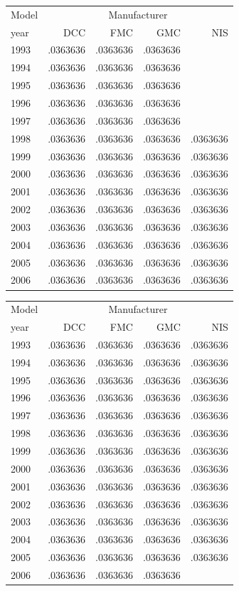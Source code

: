 \begin{tabular}{lrrrr}
\toprule
Model & \multicolumn{4}{c}{Manufacturer} \\
year & DCC & FMC & GMC & NIS \\
\midrule
1993 & .0363636 & .0363636 & .0363636 &  \\
1994 & .0363636 & .0363636 & .0363636 &  \\
1995 & .0363636 & .0363636 & .0363636 &  \\
1996 & .0363636 & .0363636 & .0363636 &  \\
1997 & .0363636 & .0363636 & .0363636 &  \\
1998 & .0363636 & .0363636 & .0363636 & .0363636 \\
1999 & .0363636 & .0363636 & .0363636 & .0363636 \\
2000 & .0363636 & .0363636 & .0363636 & .0363636 \\
2001 & .0363636 & .0363636 & .0363636 & .0363636 \\
2002 & .0363636 & .0363636 & .0363636 & .0363636 \\
2003 & .0363636 & .0363636 & .0363636 & .0363636 \\
2004 & .0363636 & .0363636 & .0363636 & .0363636 \\
2005 & .0363636 & .0363636 & .0363636 & .0363636 \\
2006 & .0363636 & .0363636 & .0363636 & .0363636 \\
\bottomrule
\end{tabular}

\begin{tabular}{lrrrr}
\toprule
Model & \multicolumn{4}{c}{Manufacturer} \\
year & DCC & FMC & GMC & NIS \\
\midrule
1993 & .0363636 & .0363636 & .0363636 & .0363636 \\
1994 & .0363636 & .0363636 & .0363636 & .0363636 \\
1995 & .0363636 & .0363636 & .0363636 & .0363636 \\
1996 & .0363636 & .0363636 & .0363636 & .0363636 \\
1997 & .0363636 & .0363636 & .0363636 & .0363636 \\
1998 & .0363636 & .0363636 & .0363636 & .0363636 \\
1999 & .0363636 & .0363636 & .0363636 & .0363636 \\
2000 & .0363636 & .0363636 & .0363636 & .0363636 \\
2001 & .0363636 & .0363636 & .0363636 & .0363636 \\
2002 & .0363636 & .0363636 & .0363636 & .0363636 \\
2003 & .0363636 & .0363636 & .0363636 & .0363636 \\
2004 & .0363636 & .0363636 & .0363636 & .0363636 \\
2005 & .0363636 & .0363636 & .0363636 & .0363636 \\
2006 & .0363636 & .0363636 & .0363636 &  \\
\bottomrule
\end{tabular}

